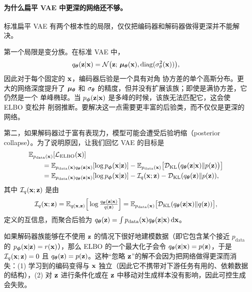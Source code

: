 \paragraph{为什么扁平 VAE 中更深的网络还不够。} 标准扁平 VAE 有两个根本性的局限，仅仅把编码器和解码器做得更深并不能解决。


第一个局限是变分族。在标准 VAE 中，
\[
q_{\bm{\theta}}({\mathbf{z}}| {\mathbf{x}})=\mathcal N \big({\mathbf{z}};\,\bm{\mu}_{{\bm{\theta}}}({\mathbf{x}}), \operatorname{diag}(\sigma_\theta^2({\mathbf{x}}))\big),
\]
因此对于每个固定的 ${\mathbf{x}}$，编码器后验是一个具有对角
协方差的单个高斯分布。更大的网络深度提升了 $\bm{\mu}_{{\bm{\theta}}}$ 和
$\sigma_{\bm{\theta}}$ 的精度，但并没有扩展该族；即使是满协方差，它仍然是一个
单峰椭球。当 $p_{\bm{\phi}}({\mathbf{z}}| {\mathbf{x}})$ 是多峰的时候，该族无法匹配它，这会使 ELBO 变松并
削弱推断。要解决这一点需要更丰富的后验类，而不仅仅是更深的网络。


第二，如果解码器过于富有表现力，模型可能会遭受后验坍缩（posterior collapse）。为了说明原因，让我们回忆 VAE 的目标是
\begin{align*}
&\mathbb{E}_{p_{\text{data}}(\mathbf{x})}[\mathcal L_{\mathrm{ELBO}}({\mathbf{x}})]\\
&\quad\quad=\mathbb{E}_{p_{\text{data}}(\mathbf{x})q_{\bm{\theta}}({\mathbf{z}}|{\mathbf{x}})}[\log p_{\bm{\phi}}({\mathbf{x}}|{\mathbf{z}})]
-\mathbb{E}_{p_{\text{data}}(\mathbf{x})}\big[\mathcal{D}_\mathrm{KL} \big(q_{\bm{\theta}}({\mathbf{z}}|{\mathbf{x}}) \| p({\mathbf{z}})\big)\big]\\
&\quad\quad=\mathbb{E}_{p_{\text{data}}(\mathbf{x})q_{\bm{\theta}}({\mathbf{z}}|{\mathbf{x}})}[\log p_{\bm{\phi}}({\mathbf{x}}|{\mathbf{z}})]-\mathcal I_q({\mathbf{x}};{\mathbf{z}}) - \mathcal{D}_\mathrm{KL}(q_{\bm{\theta}}({\mathbf{z}}) \| p({\mathbf{z}})),
\end{align*}
其中 $\mathcal I_q({\mathbf{x}};{\mathbf{z}})$ 是由
\[
\mathcal I_q({\mathbf{x}};{\mathbf{z}})
=\mathbb{E}_{q({\mathbf{x}},{\mathbf{z}})} \Big[\log \tfrac{q_{\bm{\theta}}({\mathbf{z}}|{\mathbf{x}})}{q({\mathbf{z}})}\Big]
=\mathbb{E}_{p_{\mathrm{data}}({\mathbf{x}})} \big[\mathcal{D}_\mathrm{KL}(q_{\bm{\theta}}({\mathbf{z}}|{\mathbf{x}}) \| q({\mathbf{z}}))\big],
\]
定义的互信息，而聚合后验为 $q_{\bm{\theta}}({\mathbf{z}})= \int p_{\mathrm{data}}({\mathbf{x}}) q_{\bm{\theta}}({\mathbf{z}}|{\mathbf{x}}) \mathop{}\!\mathrm{d}{\mathbf{x}}$。

如果解码器族能够在不使用 ${\mathbf{z}}$ 的情况下很好地建模数据（即它包含某个接近 $p_{\mathrm{data}}$ 的 $p_{\bm{\phi}}({\mathbf{x}}|{\mathbf{z}})=r({\mathbf{x}})$），那么 ELBO 的一个最大化子会令 $q_{\bm{\theta}}({\mathbf{z}}|{\mathbf{x}})=p({\mathbf{z}})$，于是 $\mathcal I_q({\mathbf{x}};{\mathbf{z}})=0$ 且 $q_{\bm{\theta}}({\mathbf{z}})=p({\mathbf{z}})$。这种“忽略 ${\mathbf{z}}$”的解不会因为把网络做得更深而消失：(1) 学习到的编码变得与 ${\mathbf{x}}$ 独立（因此它不携带对下游任务有用的、依赖数据的结构），(2) 对 ${\mathbf{z}}$ 进行条件化或在 ${\mathbf{z}}$ 中移动对生成样本没有影响，因此可控生成会失败。


